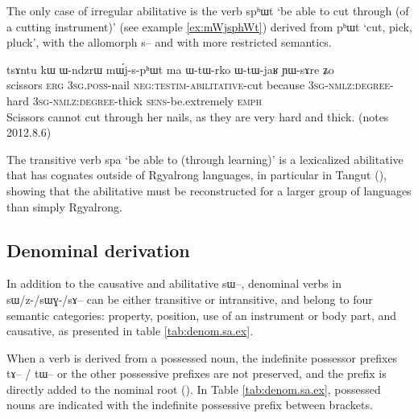\documentclass[oldfontcommands,oneside,a4paper,11pt]{article}
\newcommand{\ipa}[1]{{\phon \mbox{#1}}} %
\begin{document}
 

The only case of irregular abilitative is the verb \ipa{spʰɯt} `be able to cut through (of a cutting instrument)' (see example \ref{ex:mWjsphWt}) derived from \ipa{pʰɯt} `cut, pick, pluck', with the   allomorph \ipa{s--} and with more restricted semantics.

 \begin{exe}
\ex \label{ex:mWjsphWt}
\gll
\ipa{tsɤntu} 	\ipa{kɯ} 	\ipa{ɯ-ndzrɯ} 	\ipa{mɯ́j-s-pʰɯt} 	\ipa{ma} 	\ipa{ɯ-tɯ-rko} 	\ipa{ɯ-tɯ-jaʁ} 	\ipa{ɲɯ-sɤre} 	\ipa{ʑo} \\
scissors \textsc{erg} \textsc{3sg.poss}-nail \textsc{neg:testim-abilitative}-cut because \textsc{3sg-nmlz:degree}-hard \textsc{3sg-nmlz:degree}-thick \textsc{sens}-be.extremely \textsc{emph} \\
\glt Scissors cannot cut through her nails, as they are very hard and thick. (notes 2012.8.6)
   \end{exe}
   
The transitive verb \ipa{spa} `be able to (through learning)' is a lexicalized abilitative that has cognates outside of Rgyalrong languages, in particular in Tangut (\citealt[255-6]{jacques14esquisse}), showing that the abilitative must be reconstructed for a larger group of languages than simply Rgyalrong.


\subsection{Denominal derivation}
In addition to the causative and abilitative \ipa{sɯ--}, denominal verbs in \ipa{sɯ/z-/sɯɣ-/sɤ--} can be either transitive or intransitive, and belong to four semantic categories: property, position, use of an instrument or body part, and causative, as presented in table \ref{tab:denom.sa.ex}.

When a verb is derived from a possessed noun, the indefinite possessor prefixes \ipa{tɤ--} / \ipa{tɯ--} or the other possessive prefixes are not preserved, and the prefix is directly added to the nominal root  (\citealt{jacques14antipassive}). In Table \ref{tab:denom.sa.ex}, possessed nouns are indicated with the indefinite possessive prefix between brackets.
 
\end{document}
